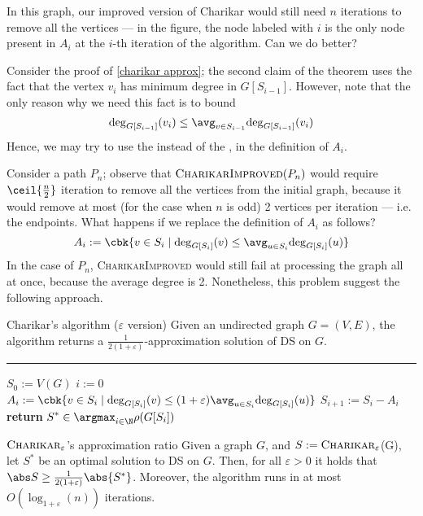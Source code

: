 \documentclass[a4paper, 12pt]{report}
\begin{document}
    In this graph, our improved version of Charikar would still need $n$ iterations to remove all the vertices --- in the figure, the node labeled with $i$ is the only node present in $A_i$ at the $i$-th iteration of the algorithm. Can we do better?

    Consider the proof of \cref{charikar approx}; the second claim of the theorem uses the fact that the vertex $v_i$ has minimum degree in $G[S_{i - 1}]$. However, note that the only reason why we need this fact is to bound $$\deg_{G[S_{i - 1}]}(v_i) \le \avg_{v \in S_{i - 1}}{\deg_{G[S_{i - 1}]}(v_i)}$$ Hence, we may try to use the  instead of the , in the definition of $A_i$.

    Consider a path $P_n$; observe that $\textsc{CharikarImproved}(P_n)$ would require $\ceil{\tfrac{n}{2}}$ iteration to remove all the vertices from the initial graph, because it would remove at most (for the case when $n$ is odd) 2 vertices per iteration --- i.e. the endpoints. What happens if we replace the definition of $A_i$ as follows? $$A_i := \cbk{v \in S_i \mid \deg_{G[S_i]}(v) \le \avg_{u \in S_i}{\deg_{G[S_i]}(u)}}$$ In the case of $P_n$, \textsc{CharikarImproved} would still fail at processing the graph all at once, because the average degree is  2. Nonetheless, this problem suggest the following approach.

    \begin{framedalgo}{Charikar's algorithm ($\varepsilon$ version)}
        Given an undirected graph $G = (V, E)$, the algorithm returns a $\tfrac{1}{2(1 + \varepsilon)}$-approximation solution of DS on $G$. \\
        \hrule

        \quad
        \begin{algorithmic}[1]
                \State $S_0 := V(G)$
                \State $i := 0$
                    \State $\displaystyle A_i := \cbk{v \in S_i \mid \deg_{G[S_i]}(v) \le (1 + \varepsilon)\avg_{u \in S_i}{\deg_{G[S_i]}(u)}}$
                    \State $S_{i + 1} := S_i - A_i$
                \EndWhile
                \State \textbf{return} $\displaystyle S^* \in \argmax_{i \in \N}{\rho(G[S_i])}$
            \EndFunction
        \end{algorithmic}
    \end{framedalgo}

    \begin{framedthm}{$\textsc{Charikar}_\varepsilon$'s approximation ratio}
        Given a graph $G$, and $S := \textsc{Charikar}_\varepsilon$(G), let $S^*$ be an optimal solution to DS on $G$. Then, for all $\varepsilon > 0$ it holds that $\abs S \ge \tfrac{1}{2(1 + \varepsilon)} \abs{S^*}$. Moreover, the algorithm runs in at most $O(\log_{1 + \varepsilon}(n))$ iterations.
    \end{framedthm}
\end{document}
